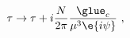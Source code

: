 \begin{equation}
\label{tauredef}
  \tau\to \tau +i\frac{N}{2\pi} 
  \frac{\glue_c}{\mu^3 \e{i\psi}}~,
\end{equation}

